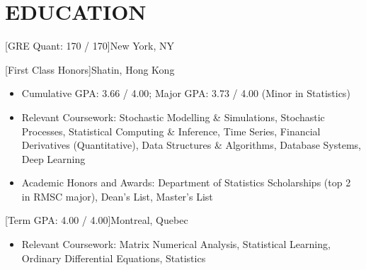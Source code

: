 \documentclass[cmu]{resume}
\begin{document}
    \address{160 Water Street, New York, NY 10038}
    \maketitle
    \section{EDUCATION}
    [GRE Quant: 170 / 170]{New York, NY}

    [First Class Honors]{Shatin, Hong Kong}
    \begin{itemize}
        \item Cumulative GPA: 3.66 / 4.00; Major GPA: 3.73 / 4.00 (Minor in Statistics)
        \item Relevant Coursework: Stochastic Modelling \& Simulations, Stochastic Processes, Statistical Computing \& Inference, Time Series, Financial Derivatives (Quantitative), Data Structures \& Algorithms, Database Systems, Deep Learning
        \item Academic Honors and Awards: Department of Statistics Scholarships (top 2 in RMSC major), Dean's List, Master's List
    \end{itemize}

    [Term GPA: 4.00 / 4.00]{Montreal, Quebec}
    \begin{itemize}
        \item Relevant Coursework: Matrix Numerical Analysis, Statistical Learning, Ordinary Differential Equations, Statistics
    \end{itemize}

\end{document}
